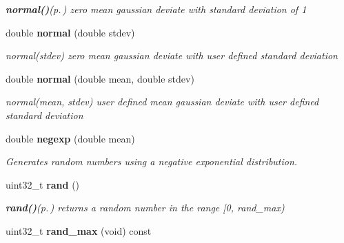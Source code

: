 \begin{CompactItemize}
\begin{CompactList}\small\item\em {\bf normal()}{\rm (p.\,\pageref{classeo_rng_a7})} zero mean gaussian deviate with standard deviation of 1 \item\end{CompactList}\item 
double {\bf normal} (double stdev)\label{classeo_rng_a8}

\begin{CompactList}\small\item\em normal(stdev) zero mean gaussian deviate with user defined standard deviation \item\end{CompactList}\item 
double {\bf normal} (double mean, double stdev)\label{classeo_rng_a9}

\begin{CompactList}\small\item\em normal(mean, stdev) user defined mean gaussian deviate with user defined standard deviation \item\end{CompactList}\item 
double {\bf negexp} (double mean)\label{classeo_rng_a10}

\begin{CompactList}\small\item\em Generates random numbers using a negative exponential distribution. \item\end{CompactList}\item 
uint32\_\-t {\bf rand} ()\label{classeo_rng_a11}

\begin{CompactList}\small\item\em {\bf rand()}{\rm (p.\,\pageref{classeo_rng_a11})} returns a random number in the range [0, rand\_\-max) \item\end{CompactList}\item 
uint32\_\-t {\bf rand\_\-max} (void) const \label{classeo_rng_a12}


\end{CompactItemize}
